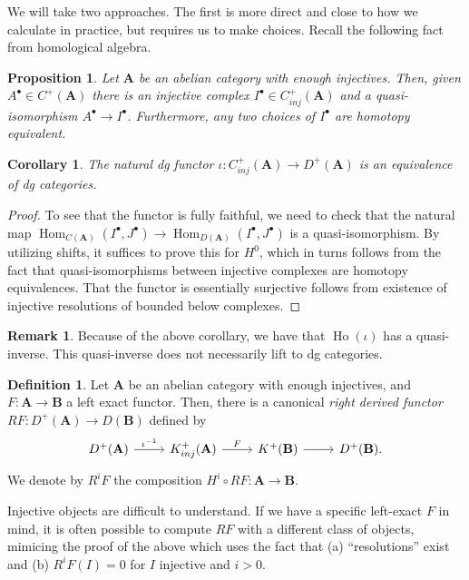 \documentclass[10pt]{article}
\newtheorem{prop}[thm]{Proposition}
\newtheorem{cor}[thm]{Corollary}
\theoremstyle{definition}
\newtheorem{defn}[thm]{Definition}
\newtheorem{rmk}[thm]{Remark}
\DeclareMathOperator{\Hom}{Hom}
\DeclareMathOperator{\Ho}{Ho}
\newcommand{\cat}{\mathbf}
\begin{document}
We will take two approaches.  The first is more direct and close to how we calculate in practice, but requires us to make choices.  Recall the following fact from homological algebra.
\begin{prop}
Let $\cat{A}$ be an abelian category with enough injectives.  Then, given $A^\bullet \in C^+(\cat{A})$ there is an injective complex $I^\bullet \in C^+_{inj}(\cat{A})$ and a quasi-isomorphism $A^\bullet \rightarrow I^\bullet$.  Furthermore, any two choices of $I^\bullet$ are homotopy equivalent.
\end{prop}

\begin{cor}
The natural dg functor $\iota: C^+_{inj}(\cat{A}) \rightarrow D^+(\cat{A})$ is an equivalence of dg categories.
\end{cor}
\begin{proof}
To see that the functor is fully faithful, we need to check that the natural map $\Hom_{C(\cat{A})}(I^\bullet, J^\bullet) \rightarrow \Hom_{D(\cat{A})}(I^\bullet, J^\bullet)$ is a quasi-isomorphism.  By utilizing shifts, it suffices to prove this for $H^0$, which in turns follows from the fact that quasi-isomorphisms between injective complexes are homotopy equivalences.  That the functor is essentially surjective follows from existence of injective resolutions of bounded below complexes.
\end{proof}

\begin{rmk}
Because of the above corollary, we have that $\Ho(\iota)$ has a quasi-inverse.  This quasi-inverse does not necessarily lift to dg categories.
\end{rmk}

\begin{defn}
Let $\cat{A}$ be an abelian category with enough injectives, and $F: \cat{A} \rightarrow \cat{B}$ a left exact functor.  Then, there is a canonical \emph{right derived functor} $RF: D^+(\cat{A}) \rightarrow D(\cat{B})$ defined by
$$\begin{tikzcd}
D^+(\cat{A}) \arrow[r, "\iota^{-1}"] & K^+_{inj}(\cat{A}) \arrow[r, "F"] & K^+(\cat{B}) \arrow[r] & D^+(\cat{B}).
\end{tikzcd}$$
We denote by $R^iF$ the composition $H^i \circ RF: \cat{A} \rightarrow \cat{B}$.
\end{defn}

Injective objects are difficult to understand.  If we have a specific left-exact $F$ in mind, it is often possible to compute $RF$ with a different class of objects, mimicing the proof of the above which uses the fact that (a) ``resolutions'' exist and (b) $R^iF(I) = 0$ for $I$ injective and $i > 0$.
\end{document}
